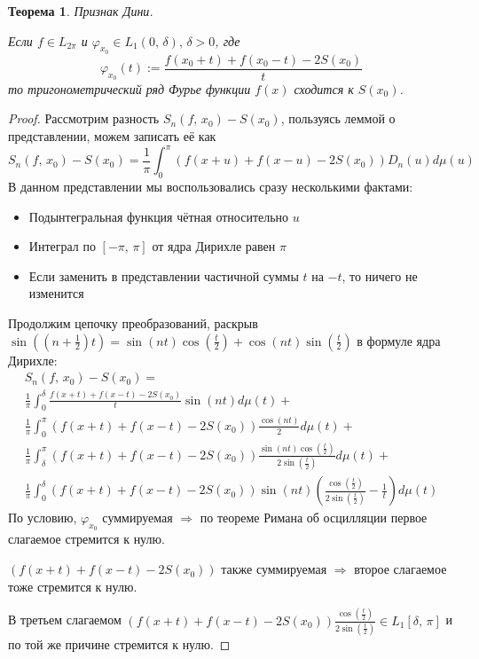 \documentclass[a4paper,12pt]{article}
\renewcommand{\phi}{\ensuremath{\varphi}}
\theoremstyle{plain}
\newtheorem{theorem}{Теорема}[section]
\theoremstyle{definition}
\theoremstyle{remark}
\begin{document}
\begin{theorem}
	Признак Дини.

	Если $f \in L_{2\pi}$ и $\phi_{x_0} \in L_1(0,\,\delta),\, \delta > 0$, где
	\[\phi_{x_0}(t) := \frac{f(x_0 + t) + f(x_0 - t) - 2S(x_0)}{t}\]
	то тригонометрический ряд Фурье функции $f(x)$ сходится к $S(x_0)$.
\end{theorem}

\begin{proof}
	Рассмотрим разность $S_n(f,\,x_0) - S(x_0)$, пользуясь леммой о представлении, можем записать её как
	\[S_n(f,\,x_0) - S(x_0) = \frac{1}{\pi}\int_{0}^\pi (f(x + u) + f(x - u) - 2S(x_0)) D_n(u)d\mu(u)\]
	В данном представлении мы воспользовались сразу несколькими фактами:
	\begin{itemize}
		\item Подынтегральная функция чётная относительно $u$
		\item Интеграл по $[-\pi,\,\pi]$ от ядра Дирихле равен $\pi$
		\item Если заменить в представлении частичной суммы $t$ на $-t$, то ничего не изменится
	\end{itemize}
	Продолжим цепочку преобразований, раскрыв $\sin((n + \frac{1}{2})t) = \sin(nt)\cos(\frac{t}{2}) + \cos(nt)\sin(\frac{t}{2})$ в формуле ядра Дирихле:
	\begin{align*}
		S_n(f,\,x_0) - S(x_0) =                                                                                                   \\
		\frac{1}{\pi} \int_0^\delta \frac{f(x + t) + f(x - t) - 2S(x_0)}{t} \sin(nt)d\mu(t) +                                     \\
		\frac{1}{\pi}\int_0^\pi (f(x + t) + f(x - t) - 2S(x_0))\frac{\cos(nt)}{2}d\mu(t) +                                        \\
		\frac{1}{\pi}\int_\delta^\pi (f(x + t) + f(x - t) - 2S(x_0))\frac{\sin(nt)\cos(\frac{t}{2})}{2\sin(\frac{t}{2})}d\mu(t) + \\
		\frac{1}{\pi}\int_0^\delta (f(x + t) + f(x - t) - 2S(x_0))\sin(nt) \left(\frac{\cos(\frac{t}{2})}{2\sin(\frac{t}{2})} - \frac{1}{t}\right)d\mu(t)
	\end{align*}
	По условию, $\phi_{x_0}$ суммируемая $\Rightarrow$ по теореме Римана об осцилляции первое слагаемое стремится к нулю.

	$(f(x + t) + f(x-t) - 2S(x_0))$ также суммируемая $\Rightarrow$ второе слагаемое тоже стремится к нулю.

	В третьем слагаемом $(f(x + t) + f(x - t) - 2S(x_0))\frac{\cos(\frac{t}{2})}{2\sin(\frac{t}{2})} \in L_1[\delta,\,\pi]$ и по той же причине стремится к нулю.


\end{proof}
\end{document}
